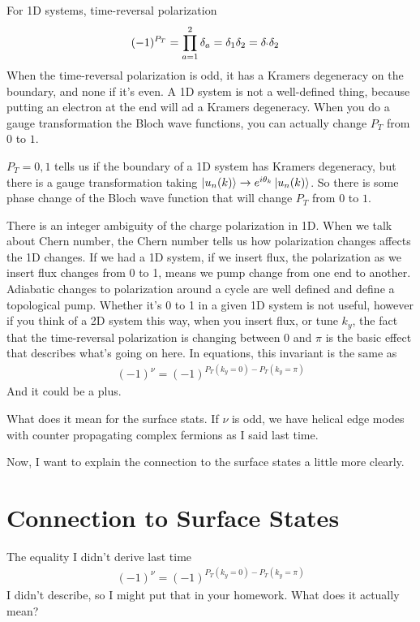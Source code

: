 For 1D systems,
time-reversal polarization
\begin{align}
    (-1)^{P_T} &=
    \prod_{a=1}^{2}\delta_a = \delta_1 \delta_2
    = \delta_` \delta_2
\end{align}
When the time-reversal polarization is odd,
it has a Kramers degeneracy on the boundary,
and none if it's even.
A 1D system is not a well-defined thing,
because putting an electron at the end will ad a Kramers degeneracy.
When you do a gauge transformation the Bloch wave functions,
you can actually change $P_T$ from $0$ to $1$.

$P_T=0,1$ tells us if the boundary of a 1D system has Kramers degeneracy,
but there is a gauge transformation taking
$\ket{u_n(k)}\to e^{i\theta_k}\ket{u_n(k)}$.
So there is some phase change of the Bloch wave function that will change $P_T$
from $0$ to $1$.

There is an integer ambiguity of the charge polarization in 1D.
When we talk about Chern number,
the Chern number tells us how polarization changes affects the 1D changes.
If we had a 1D system,
if we insert flux,
the polarization as we insert flux changes from 0 to 1,
means we pump change from one end to another.
Adiabatic changes to polarization around a cycle are well defined and define
a topological pump.
Whether it's 0 to 1 in a given 1D system is not useful,
however if you think of a 2D system this way,
when you insert flux, or tune $k_y$,
the fact that the time-reversal polarization is changing between 0 and $\pi$
is the basic effect that describes what's going on here.
In equations,
this invariant is the same as
\begin{align}
    (-1)^{\nu} = (-1)^{P_T(k_y=0) - P_T(k_y = \pi)}
\end{align}
And it could be a plus.

What does it mean for the surface stats.
If $\nu$ is odd,
we have helical edge modes with counter propagating complex fermions as I said
last time.

Now, I want to explain the connection to the surface states a little more
clearly.

\section{Connection to Surface States}
The equality I didn't derive last time
\begin{align}
    (-1)^{\nu} = (-1)^{P_T(k_y=0) - P_T(k_y = \pi)}
\end{align}
I didn't describe,
so I might put that in your homework.
What does it actually mean?

